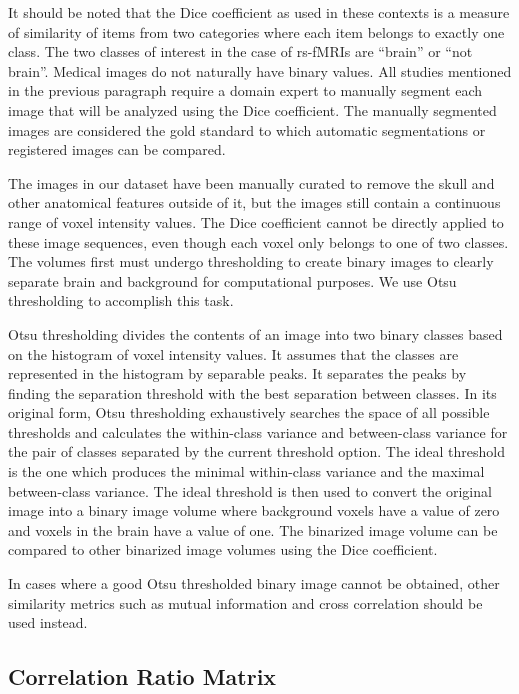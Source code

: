 It should be noted that the Dice coefficient as used in these contexts is a measure of similarity of items from two categories where each item belongs to exactly one class. The two classes of interest in the case of rs-fMRIs are ``brain'' or ``not brain''. Medical images do not naturally have binary values. All studies mentioned in the previous paragraph require a domain expert to manually segment each image that will be analyzed using the Dice coefficient. The manually segmented images are considered the gold standard to which automatic segmentations or registered images can be compared. 

The images in our dataset have been manually curated to remove the skull and other anatomical features outside of it, but the images still contain a continuous range of voxel intensity values. The Dice coefficient cannot be directly applied to these image sequences, even though each voxel only belongs to one of two classes. The volumes first must undergo thresholding to create binary images to clearly separate brain and background for computational purposes. We use Otsu thresholding to accomplish this task. 

Otsu thresholding divides the contents of an image into two binary classes based on the histogram of voxel intensity values. It assumes that the classes are represented in the histogram by separable peaks. It separates the peaks by finding the separation threshold with the best separation between classes. In its original form, Otsu thresholding exhaustively searches the space of all possible thresholds and calculates the within-class variance and between-class variance for the pair of classes separated by the current threshold option. The ideal threshold is the one which produces the minimal within-class variance and the maximal between-class variance. The ideal threshold is then used to convert the original image into a binary image volume where background voxels have a value of zero and voxels in the brain have a value of one. The binarized image volume can be compared to other binarized image volumes using the Dice coefficient. 

In cases where a good Otsu thresholded binary image cannot be obtained, other similarity metrics such as mutual information and cross correlation should be used instead.

\subsection{Correlation Ratio Matrix}


